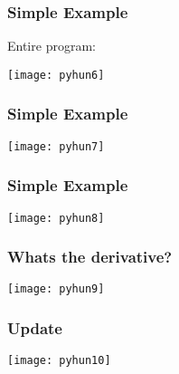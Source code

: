\begin{frame}[fragile] \frametitle{Simple Example}
Entire program:
\begin{center}
\texttt{[image: pyhun6]}
\end{center}


\end{frame}

\begin{frame}[fragile] \frametitle{Simple Example}
\begin{center}
\texttt{[image: pyhun7]}
\end{center}


\end{frame}

\begin{frame}[fragile] \frametitle{Simple Example}
\begin{center}
\texttt{[image: pyhun8]}
\end{center}


\end{frame}

\begin{frame}[fragile] \frametitle{Whats the derivative?}

\begin{center}
\texttt{[image: pyhun9]}
\end{center}



\end{frame}

\begin{frame}[fragile] \frametitle{Update}

\begin{center}
\texttt{[image: pyhun10]}
\end{center}


\end{frame}

